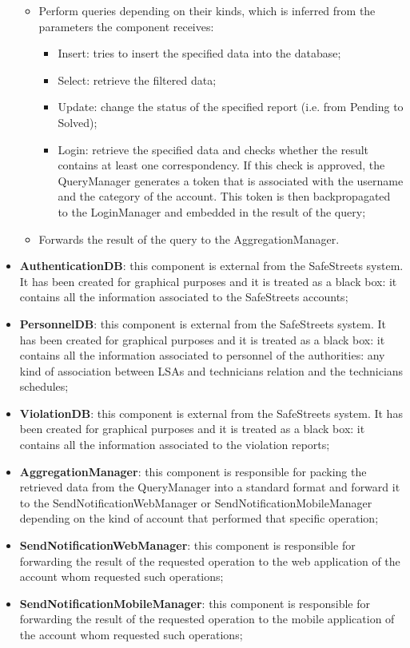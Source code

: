 \begin{itemize}
    \begin{itemize}
        \item Perform queries depending on their kinds, which is inferred from the parameters the component receives: 
        \begin{itemize}
            \item Insert: tries to insert the specified data into the database;
            \item Select: retrieve the filtered data;
            \item Update: change the status of the specified report (i.e. from Pending to Solved);
            \item Login: retrieve the specified data and checks whether the result contains at least one correspondency. If this check is approved, the QueryManager generates a token that is associated with the username and the category of the account. This token is then backpropagated to the LoginManager and embedded in the result of the query;
        \end{itemize}
        \item Forwards the result of the query to the AggregationManager.
    \end{itemize}
    \item \textbf{AuthenticationDB}: this component is external from the SafeStreets system. It has been created for graphical purposes and it is treated as a black box: it contains all the information associated to the SafeStreets accounts;
    \item \textbf{PersonnelDB}: this component is external from the SafeStreets system. It has been created for graphical purposes and it is treated as a black box: it contains all the information associated to personnel of the authorities: any kind of association between LSAs and technicians relation and the technicians schedules;
    \item \textbf{ViolationDB}: this component is external from the SafeStreets system. It has been created for graphical purposes and it is treated as a black box: it contains all the information associated to the violation reports;
    \item \textbf{AggregationManager}: this component is responsible for packing the retrieved data from the QueryManager into a standard format and forward it to the SendNotificationWebManager or SendNotificationMobileManager depending on the kind of account that performed that specific operation;
    \item \textbf{SendNotificationWebManager}: this component is responsible for forwarding the result of the requested operation to the web application of the account whom requested such operations;
    \item \textbf{SendNotificationMobileManager}: this component is responsible for forwarding the result of the requested operation to the mobile application of the account whom requested such operations;
\end{itemize}

\newpage
